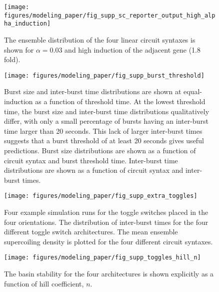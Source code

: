 \documentclass[11pt]{article}
\begin{document}
\begin{figure}[hbtp]
    \centering
    \texttt{[image: figures/modeling\_paper/fig\_supp\_sc\_reporter\_output\_high\_alpha\_induction]}
    \caption{The ensemble distribution of the four linear circuit syntaxes is shown for \(\alpha = 0.03\) and high induction of the adjacent gene (1.8 fold).}
    \label{fig:supp:sc_distributions_high_alpha_induction}
\end{figure}
\begin{figure}[hbtp]
    \centering
    {\texttt{[image: figures/modeling\_paper/fig\_supp\_burst\_threshold]}
    \label{fig:burst_threshold_burst_size}
    \label{fig:burst_threshold_interburst_time}
    }
    \caption{Burst size and inter-burst time distributions are shown at equal-induction as a function of threshold time. At the lowest threshold time, the burst size and inter-burst time distributions qualitatively differ, with only a small percentage of bursts having an inter-burst time larger than 20 seconds. This lack of larger inter-burst times suggests that a burst threshold of at least 20 seconds gives useful predictions.
         Burst size distributions are shown as a function of circuit syntax and burst threshold time.
         Inter-burst time distributions are shown as a function of circuit syntax and inter-burst times.
    }
    \label{fig:top:burst_threshold}
\end{figure}

\begin{figure}[hbtp]
    \centering
    {\texttt{[image: figures/modeling\_paper/fig\_supp\_extra\_toggles]}
    \label{fig:supp_toggles_run_examples}
    \label{fig:supp_toggles_interburst_time}
    \label{fig:supp_toggles_mean_sc_density}
    }
    \caption{
         Four example simulation runs for the toggle switches placed in the four orientations. 
         The distribution of inter-burst times for the four different toggle switch architectures.
         The mean ensemble supercoiling density is plotted for the four different circuit syntaxes.
    }
    \label{fig:supp:toggles_examples_density_interburst}
\end{figure}

\begin{figure}[hbtp]
    \centering
    {\texttt{[image: figures/modeling\_paper/fig\_supp\_toggles\_hill\_n]}
    }
    \caption{The basin stability for the four architectures is shown explicitly as a function of hill coefficient, \(n\).}
    \label{fig:supp:toggles_hill_n_sweep}
\end{figure}
\end{document}
